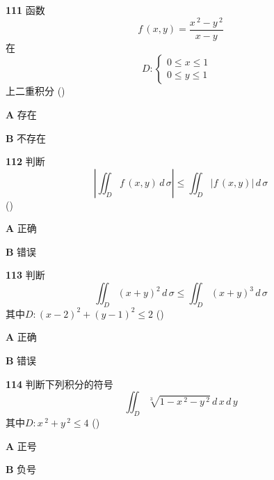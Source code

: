 \documentclass[a4paper,10pt]{article} %
\begin{document}


\textheight


\par\noindent \textbf{111} \quad 函数
$$ f\,(x,y)=\frac{x\,^2-y\,^2}{x-y}$$
在
\begin{equation*}    D:
 \begin{cases}
    0\leq x\leq 1 &   \\
    0\leq y\leq 1 & 
 \end{cases}                
\end{equation*}
上二重积分 \hfill (\quad\quad\quad)
\par\noindent \textbf{A} \quad 存在
\par\noindent \textbf{B} \quad 不存在





\textheight


\par\noindent \textbf{112} \quad 判断
$$ \left|\iint_D f\,(x,y)\,d\,\sigma\right| \leq \iint_D \big |f\,(x,y)\big |\,d\,\sigma$$
 \hfill (\quad\quad\quad)
\par\noindent \textbf{A} \quad 正确
\par\noindent \textbf{B} \quad 错误





\textheight


\par\noindent \textbf{113} \quad 判断
$$ \iint_D (x+y)^2\,d\,\sigma \leq \iint_D (x+y)^3\,d\,\sigma$$
其中$D: (x-2)^2+(y-1)^2\leq 2$ \hfill (\quad\quad\quad)
\par\noindent \textbf{A} \quad 正确
\par\noindent \textbf{B} \quad 错误





\textheight


\par\noindent \textbf{114} \quad 判断下列积分的符号
$$ \iint_D \sqrt[3]{1-x\,^2-y\,^2}\,d\,x\,d\,y$$
其中$D: x\,^2+y\,^2\leq 4$ \hfill (\quad\quad\quad)
\par\noindent \textbf{A} \quad 正号
\par\noindent \textbf{B} \quad 负号
\end{document}
